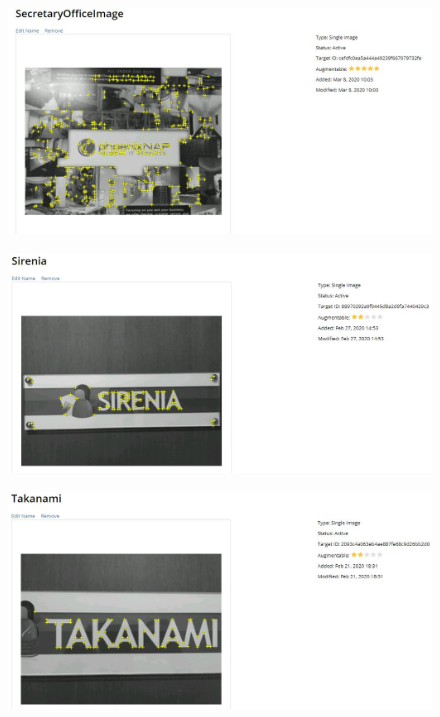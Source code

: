\documentclass{aifyp}
\begin{document}
\begin{appendices}
\begin{figure}[H]
\begin{minipage}{.5\textwidth}
          \label{fig:PomeranianImageTarget}
        \end{minipage}
\end{figure}
\begin{figure}[H]
    \centering
        \begin{minipage}{.5\textwidth}
          \centering
          \includegraphics[scale=0.3]{Images/Chapter6/SecretaryImageTarget.JPG}
          \label{fig:SecretaryImageTarget}
        \end{minipage}%
        \begin{minipage}{.5\textwidth}
          \centering
          \includegraphics[scale=0.3]{Images/Chapter6/SireniaImageTarget.JPG}
          \label{fig:SireniaImageTarget}
        \end{minipage}
\end{figure}
\begin{figure}[H]
    \centering
        \begin{minipage}{.5\textwidth}
          \centering
          \includegraphics[scale=0.3]{Images/Chapter6/TakanamiImageTarget.JPG}

\end{minipage}
\end{figure}
\end{appendices}
\end{document}
